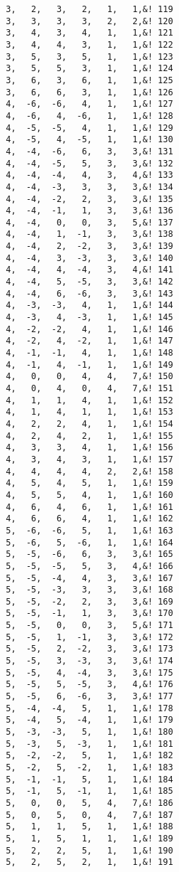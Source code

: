 \begin{Verbatim}
  3,   2,   3,   2,   1,   1,&! 119
  3,   3,   3,   3,   2,   2,&! 120
  3,   4,   3,   4,   1,   1,&! 121
  3,   4,   4,   3,   1,   1,&! 122
  3,   5,   3,   5,   1,   1,&! 123
  3,   5,   5,   3,   1,   1,&! 124
  3,   6,   3,   6,   1,   1,&! 125
  3,   6,   6,   3,   1,   1,&! 126
  4,  -6,  -6,   4,   1,   1,&! 127
  4,  -6,   4,  -6,   1,   1,&! 128
  4,  -5,  -5,   4,   1,   1,&! 129
  4,  -5,   4,  -5,   1,   1,&! 130
  4,  -4,  -6,   6,   3,   3,&! 131
  4,  -4,  -5,   5,   3,   3,&! 132
  4,  -4,  -4,   4,   3,   4,&! 133
  4,  -4,  -3,   3,   3,   3,&! 134
  4,  -4,  -2,   2,   3,   3,&! 135
  4,  -4,  -1,   1,   3,   3,&! 136
  4,  -4,   0,   0,   3,   5,&! 137
  4,  -4,   1,  -1,   3,   3,&! 138
  4,  -4,   2,  -2,   3,   3,&! 139
  4,  -4,   3,  -3,   3,   3,&! 140
  4,  -4,   4,  -4,   3,   4,&! 141
  4,  -4,   5,  -5,   3,   3,&! 142
  4,  -4,   6,  -6,   3,   3,&! 143
  4,  -3,  -3,   4,   1,   1,&! 144
  4,  -3,   4,  -3,   1,   1,&! 145
  4,  -2,  -2,   4,   1,   1,&! 146
  4,  -2,   4,  -2,   1,   1,&! 147
  4,  -1,  -1,   4,   1,   1,&! 148
  4,  -1,   4,  -1,   1,   1,&! 149
  4,   0,   0,   4,   4,   7,&! 150
  4,   0,   4,   0,   4,   7,&! 151
  4,   1,   1,   4,   1,   1,&! 152
  4,   1,   4,   1,   1,   1,&! 153
  4,   2,   2,   4,   1,   1,&! 154
  4,   2,   4,   2,   1,   1,&! 155
  4,   3,   3,   4,   1,   1,&! 156
  4,   3,   4,   3,   1,   1,&! 157
  4,   4,   4,   4,   2,   2,&! 158
  4,   5,   4,   5,   1,   1,&! 159
  4,   5,   5,   4,   1,   1,&! 160
  4,   6,   4,   6,   1,   1,&! 161
  4,   6,   6,   4,   1,   1,&! 162
  5,  -6,  -6,   5,   1,   1,&! 163
  5,  -6,   5,  -6,   1,   1,&! 164
  5,  -5,  -6,   6,   3,   3,&! 165
  5,  -5,  -5,   5,   3,   4,&! 166
  5,  -5,  -4,   4,   3,   3,&! 167
  5,  -5,  -3,   3,   3,   3,&! 168
  5,  -5,  -2,   2,   3,   3,&! 169
  5,  -5,  -1,   1,   3,   3,&! 170
  5,  -5,   0,   0,   3,   5,&! 171
  5,  -5,   1,  -1,   3,   3,&! 172
  5,  -5,   2,  -2,   3,   3,&! 173
  5,  -5,   3,  -3,   3,   3,&! 174
  5,  -5,   4,  -4,   3,   3,&! 175
  5,  -5,   5,  -5,   3,   4,&! 176
  5,  -5,   6,  -6,   3,   3,&! 177
  5,  -4,  -4,   5,   1,   1,&! 178
  5,  -4,   5,  -4,   1,   1,&! 179
  5,  -3,  -3,   5,   1,   1,&! 180
  5,  -3,   5,  -3,   1,   1,&! 181
  5,  -2,  -2,   5,   1,   1,&! 182
  5,  -2,   5,  -2,   1,   1,&! 183
  5,  -1,  -1,   5,   1,   1,&! 184
  5,  -1,   5,  -1,   1,   1,&! 185
  5,   0,   0,   5,   4,   7,&! 186
  5,   0,   5,   0,   4,   7,&! 187
  5,   1,   1,   5,   1,   1,&! 188
  5,   1,   5,   1,   1,   1,&! 189
  5,   2,   2,   5,   1,   1,&! 190
  5,   2,   5,   2,   1,   1,&! 191

\end{Verbatim}
